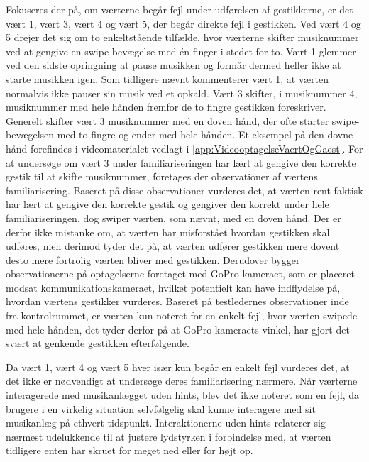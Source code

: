Fokuseres der på, om værterne begår fejl under udførelsen af gestikkerne, er det vært 1, vært 3, vært 4 og vært 5, der begår direkte fejl i gestikken. Ved vært 4 og 5 drejer det sig om to enkeltstående tilfælde, hvor værterne skifter musiknummer ved at gengive en swipe-bevægelse med én finger i stedet for to. Vært 1 glemmer ved den sidste opringning at pause musikken og formår dermed heller ikke at starte musikken igen. Som tidligere nævnt kommenterer vært 1, at værten normalvis ikke pauser sin musik ved et opkald. Vært 3 skifter, i musiknummer 4, musiknummer med hele hånden fremfor de to fingre gestikken foreskriver. Generelt skifter vært 3 musiknummer med en doven hånd, der ofte starter swipe-bevægelsen med to fingre og ender med hele hånden. Et eksempel på den dovne hånd forefindes i videomaterialet vedlagt i \autoref{app:VideooptagelseVaertOgGaest}. For at undersøge om vært 3 under familiariseringen har lært at gengive den korrekte gestik til at skifte musiknummer, foretages der observationer af værtens familiarisering. Baseret på disse observationer vurderes det, at værten rent faktisk har lært at gengive den korrekte gestik og gengiver den korrekt under hele familiariseringen, dog swiper værten, som nævnt, med en doven hånd. Der er derfor ikke mistanke om, at værten har misforstået hvordan gestikken skal udføres, men derimod tyder det på, at værten udfører gestikken mere dovent desto mere fortrolig værten bliver med gestikken. Derudover bygger observationerne på optagelserne foretaget med GoPro-kameraet, som er placeret modsat kommunikationskameraet, hvilket potentielt kan have indflydelse på, hvordan værtens gestikker vurderes. Baseret på testledernes observationer inde fra kontrolrummet, er værten kun noteret for en enkelt fejl, hvor værten swipede med hele hånden, det tyder derfor på at GoPro-kameraets vinkel, har gjort det svært at genkende gestikken efterfølgende. 

Da vært 1, vært 4 og vært 5 hver især kun begår en enkelt fejl vurderes det, at det ikke er nødvendigt at undersøge deres familiarisering nærmere.\blankline
%
Når værterne interagerede med musikanlægget uden hints, blev det ikke noteret som en fejl, da brugere i en virkelig situation selvfølgelig skal kunne interagere med sit musikanlæg på ethvert tidspunkt. Interaktionerne uden hints relaterer sig nærmest udelukkende til at justere lydstyrken i forbindelse med, at værten tidligere enten har skruet for meget ned eller for højt op. 

